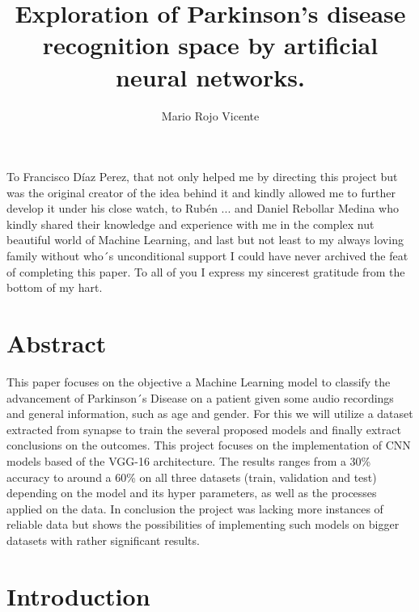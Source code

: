 \documentclass[12pt, a4paper]{article}
\title{Exploration of Parkinson's disease recognition space by artificial neural networks.}
\author{Mario Rojo Vicente}
\date{}	 							%
\begin{document}
	
	 
	
	\section*{}
	\begin{flushleft}
		\vspace*{\fill}
		To Francisco Díaz Perez, that not only helped me by directing this project but was the original creator of the idea behind it and kindly allowed me to further develop it under his close watch, to Rubén ... and Daniel Rebollar Medina who kindly shared their knowledge and experience with me in the complex nut beautiful world of Machine Learning, and last but not least to my always loving family without who´s unconditional support I could have never archived the feat of completing this paper. To all of you I express my sincerest gratitude from the bottom of my hart.
		\vspace*{\fill}
		
	\end{flushleft}

	\clearpage
	
	\section*{Abstract}
	
	This paper focuses on the objective a Machine Learning model to classify the advancement of Parkinson´s Disease on a patient given some audio recordings and general information, such as age and gender. For this we will utilize a dataset extracted from synapse to train the several proposed models and finally extract conclusions on the outcomes. This project focuses on the implementation of CNN models based of the VGG-16 architecture. The results ranges from a 30\% accuracy to around a 60\% on all three datasets (train, validation and test) depending on the model and its hyper parameters, as well as the processes applied on the data. In conclusion the project was lacking more instances of reliable data but shows the possibilities of implementing such models on bigger datasets with rather significant results.
	
	
	\clearpage
	
	\tableofcontents
	
	\clearpage
		
	\section{Introduction}
	
\end{document}
